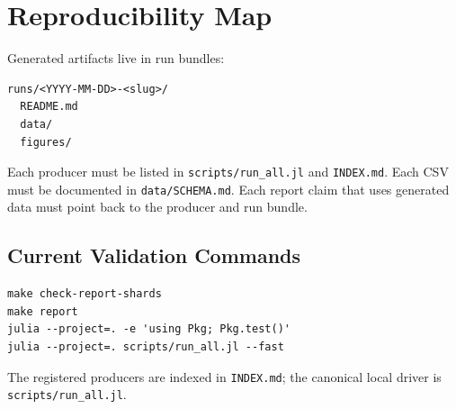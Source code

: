 
\section{Reproducibility Map}

Generated artifacts live in run bundles:

\begin{verbatim}
runs/<YYYY-MM-DD>-<slug>/
  README.md
  data/
  figures/
\end{verbatim}

Each producer must be listed in \texttt{scripts/run\_all.jl} and
\texttt{INDEX.md}. Each CSV must be documented in \texttt{data/SCHEMA.md}.
Each report claim that uses generated data must point back to the producer and
run bundle.

\subsection{Current Validation Commands}

\begin{verbatim}
make check-report-shards
make report
julia --project=. -e 'using Pkg; Pkg.test()'
julia --project=. scripts/run_all.jl --fast
\end{verbatim}

The registered producers are indexed in \texttt{INDEX.md}; the canonical local
driver is \texttt{scripts/run\_all.jl}.

